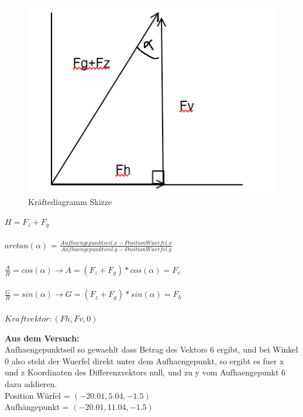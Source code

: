 \documentclass[../main.tex]{subfiles}
\begin{document}
     \begin{figure}[H]
               \begin{center}
                   \centerline{\includegraphics[width=155mm]{./images/Lab3Unity/KraefteDiagramm.png}}
                   \caption{Kräftediagramm Skizze}
                   \label{fig:KräfteDiagramm}
               \end{center}
     \end{figure}
\begin{mdframed}
$H = F_z +F_g$\\\\
$arctan(\alpha)$ = $\frac{Aufhaengepunktseil.x-Position Wuerfel.x }{Aufhaengepunktseil.y-Position Wuerfel.y }$\\\\
$\frac{A}{H}= cos(\alpha) \rightarrow A = (F_z + F_g) * cos(\alpha)= F_v$\\\\
$\frac{G}{H}= sin(\alpha) \rightarrow G = (F_z + F_g) * sin(\alpha)= F_h$\\\\
$Kraftvektor: (Fh,Fv,0)$
\end{mdframed}
\textbf {Aus dem Versuch:\\}
Aufhaengepunktseil so gewaehlt dass Betrag des Vektors 6 ergibt, und bei Winkel 0 also steht der Wuerfel direkt unter dem Aufhaengepunkt, so ergibt es fuer x und z Koordinaten des Differenzvektors null, und zu y vom Aufhaengepunkt 6 dazu addieren.\\
Position Würfel = $(-20.01,5.04,-1.5)$\\
Aufhängepunkt = $(-20.01,11.04,-1.5)$\\
\end{document}
